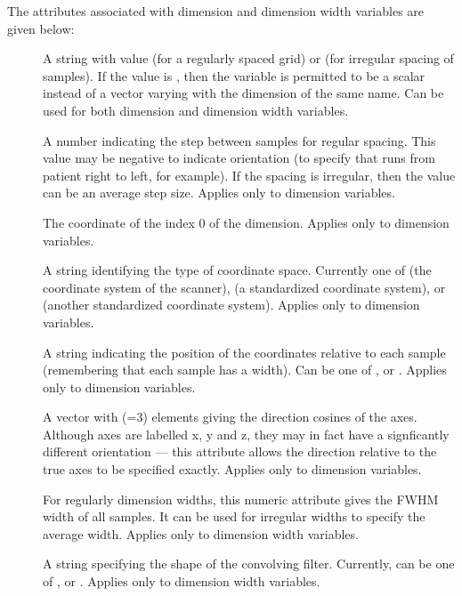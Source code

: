 The attributes associated with dimension and dimension width variables
are given below:
\begin{description}
   \item [] A string with value  (for
      a regularly spaced grid) or  (for irregular
      spacing of samples). If the value is , then the
      variable is permitted to be a scalar instead of a vector varying
      with the dimension of the same name. Can be used for both
      dimension and dimension width variables.
   \item [] A number indicating the step between samples
      for regular spacing. This value may be negative to indicate
      orientation (to specify that  runs from patient
      right to left, for example). If the spacing is irregular, then
      the value can be an average step size. Applies only to dimension
      variables. 
   \item [] The coordinate of the index 0 of the dimension.
      Applies only to dimension variables.
   \item [] A string identifying the type of
      coordinate space. Currently one of  (the
      coordinate system of the scanner),  (a
      standardized coordinate system), or  (another
      standardized coordinate system). Applies only to dimension variables.
   \item [] A string indicating the position of the
      coordinates relative to each sample (remembering that each sample
      has a width). Can be one of ,  or
      . Applies only to dimension variables.
   \item [] A vector with
      (=3) elements giving the
      direction cosines of the axes. Although axes are labelled x, y
      and z, they may in fact have a signficantly different
      orientation --- this attribute allows the direction relative to
      the true axes to be specified exactly. Applies only to dimension
      variables. 
   \item [] For regularly dimension widths, this
      numeric attribute gives the FWHM width of all samples. It can be used
      for irregular widths to specify the average width. Applies only
      to dimension width variables.
   \item [] A string specifying the shape of the
      convolving filter. Currently, can be one of ,
       or . Applies only to
      dimension width variables.
\end{description}

